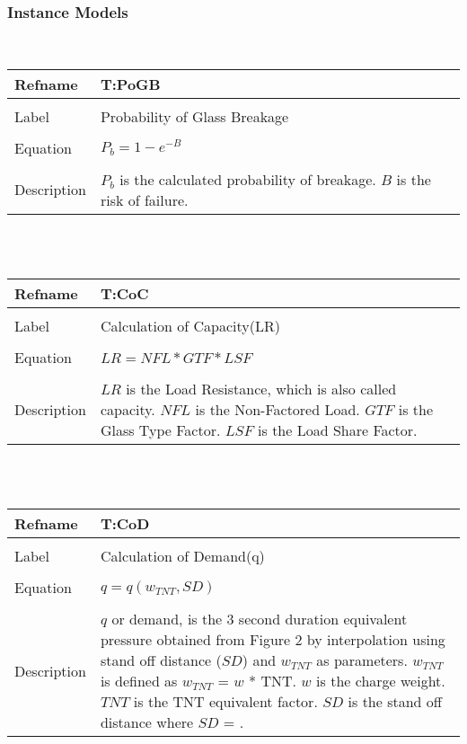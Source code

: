 \documentclass[12pt]{article}
\begin{document}
\subsubsection{Instance Models}
\label{Sec:IM}
~\newline
\noindent \begin{minipage}{\textwidth}
\begin{tabular}{p{} p{}}
\toprule \textbf{Refname} & \textbf{T:PoGB}
\label{T:PoGB}
\\ \midrule \\
Label & Probability of Glass Breakage
\\ \midrule \\
Equation & $P_{b}=1-e^{-B}$
\\ \midrule \\
Description & $P_{b}$ is the calculated probability of breakage. $B$ is the risk of failure.
\\ \bottomrule \end{tabular}
\end{minipage}\\
~\newline
\noindent \begin{minipage}{\textwidth}
\begin{tabular}{p{} p{}}
\toprule \textbf{Refname} & \textbf{T:CoC}
\label{T:CoC}
\\ \midrule \\
Label & Calculation of Capacity(LR)
\\ \midrule \\
Equation & $LR=NFL*GTF*LSF$
\\ \midrule \\
Description & $LR$ is the Load Resistance, which is also called capacity. $NFL$ is the Non-Factored Load. $GTF$ is the Glass Type Factor. $LSF$ is the Load Share Factor.
\\ \bottomrule \end{tabular}
\end{minipage}\\
~\newline
\noindent \begin{minipage}{\textwidth}
\begin{tabular}{p{} p{}}
\toprule \textbf{Refname} & \textbf{T:CoD}
\label{T:CoD}
\\ \midrule \\
Label & Calculation of Demand(q)
\\ \midrule \\
Equation & $q=q(w_{TNT},SD)$
\\ \midrule \\
Description & $q$ or demand, is the 3 second duration equivalent pressure obtained from Figure 2 by interpolation using stand off distance ($SD$) and $w_{TNT}$ as parameters. $w_{TNT}$ is defined as $w_{TNT}$ = $w$ * TNT. $w$ is the charge weight. $TNT$ is the TNT equivalent factor. $SD$ is the stand off distance where $SD$ = .
\\ \bottomrule \end{tabular}
\end{minipage}\\
\end{document}
